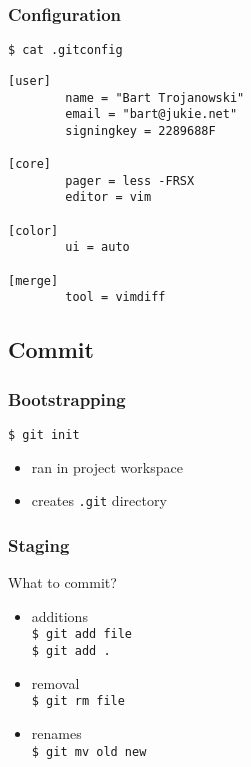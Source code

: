 \documentclass[english]{beamer}
\newcommand{\mysubsection}[2]{%
  \hypertarget{#2}{}%
  \subsection{#1}%
  \label{#2}%
}
\newcommand{\CMD}[1]{%
\texttt{\textcolor{code-green}{#1}}%
}
\begin{document}
\begin{frame}[fragile]
\frametitle{Configuration}

\CMD{\$ cat .gitconfig}
{\small
\begin{Verbatim}[commandchars=\\\{\}]
[user]
        name = "Bart Trojanowski"
        email = "bart@jukie.net"
        signingkey = 2289688F

[core]
        pager = less -FRSX
        editor = vim

[color]
        ui = auto

[merge]
        tool = vimdiff

\end{Verbatim}
}

\end{frame}

\mysubsection{Commit}{using:commit}
\begin{frame}
\frametitle{Bootstrapping}

\CMD{\$ git init} \\
\begin{itemize}
        \item ran in project workspace
        \item creates \CMD{.git} directory
\end{itemize}
\end{frame}

\begin{frame}
\frametitle{Staging}

What to commit?

\pause{}
\vspace{.1\textheight}

\begin{itemize}
        \item additions \\
                \CMD{\$ git add file} \\
                \CMD{\$ git add .}

                \pause{}
                \vspace{.1\textheight}

        \item removal \\
                \CMD{\$ git rm file}

                \pause{}
                \vspace{.1\textheight}

        \item renames \\
                \CMD{\$ git mv old new}
\end{itemize}
\end{frame}
\end{document}
